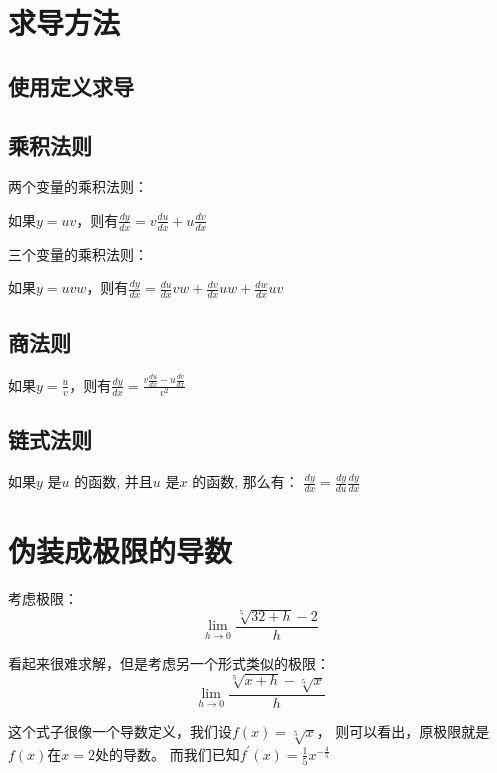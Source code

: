 \documentclass[11pt, b5paper, oneside]{book}
\begin{document}
\section{求导方法}

\subsection{使用定义求导}

\subsection{乘积法则}
两个变量的乘积法则：
\begin{center}
    如果$y=uv$，则有$\frac{dy}{dx}=v\frac{du}{dx}+u\frac{dv}{dx}$
\end{center}

三个变量的乘积法则：
\begin{center}
    如果$y=uvw$，则有$\frac{dy}{dx}=\frac{du}{dx}vw+\frac{dv}{dx}uw+\frac{dw}{dx}uv$
\end{center}

\subsection{商法则}
\begin{center}
    如果$y=\frac{u}{v}$，则有$\frac{dy}{dx}=\frac{v\frac{du}{dx}-u\frac{dv}{dx}}{v^2}$
\end{center}

\subsection{链式法则}
\begin{center}
    如果$y$ 是$u$ 的函数, 并且$u$ 是$x$ 的函数, 那么有：
    $\frac{dy}{dx}=\frac{dy}{du}\frac{dy}{dx}$
\end{center}

\section{伪装成极限的导数}

考虑极限：
\[\lim\limits_{h\to 0}\frac{\sqrt[5]{32+h}-2}{h}\]

看起来很难求解，但是考虑另一个形式类似的极限：
\[\lim\limits_{h\to 0}\frac{\sqrt[5]{x+h}-\sqrt[5]{x}}{h}\]

这个式子很像一个导数定义，我们设$f(x)=\sqrt[5]{x}$，
则可以看出，原极限就是$f(x)$在$x=2$处的导数。
而我们已知$f^{'}(x)=\frac{1}{5}x^{-\frac{4}{5}}$
\end{document}
